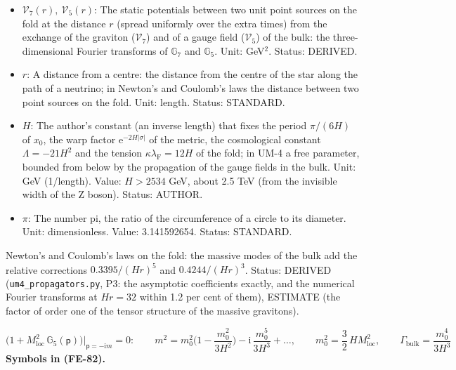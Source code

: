 \documentclass[
  10pt,
]{article}
\providecommand{\tightlist}{%
  \setlength{\itemsep}{0pt}\setlength{\parskip}{0pt}}
\begin{document}
\begin{itemize}
\tightlist
\item
  \(\mathcal{V}_7(r),\ \mathcal{V}_5(r)\): The static potentials between
  two unit point sources on the fold at the distance \(r\) (spread
  uniformly over the extra times) from the exchange of the graviton
  (\(\mathcal{V}_7\)) and of a gauge field (\(\mathcal{V}_5\)) of the
  bulk: the three-dimensional Fourier transforms of \(\mathbb{G}_7\) and
  \(\mathbb{G}_5\). Unit: GeV\(^2\). Status: DERIVED.
\item
  \(r\): A distance from a centre: the distance from the centre of the
  star along the path of a neutrino; in Newton's and Coulomb's laws the
  distance between two point sources on the fold. Unit: length. Status:
  STANDARD.
\item
  \(H\): The author's constant (an inverse length) that fixes the period
  \(\pi/(6H)\) of \(x_0\), the warp factor
  \(\mathrm{e}^{-2H\lvert\sigma\rvert}\) of the metric, the cosmological
  constant \(\Lambda = -21H^2\) and the tension
  \(\kappa\lambda_{\mathrm{F}} = 12H\) of the fold; in UM-4 a free
  parameter, bounded from below by the propagation of the gauge fields
  in the bulk. Unit: GeV (1/length). Value: \(H > 2534\) GeV, about 2.5
  TeV (from the invisible width of the Z boson). Status: AUTHOR.
\item
  \(\pi\): The number pi, the ratio of the circumference of a circle to
  its diameter. Unit: dimensionless. Value: 3.141592654. Status:
  STANDARD.
\end{itemize}

Newton's and Coulomb's laws on the fold: the massive modes of the bulk
add the relative corrections \(0.3395/(Hr)^5\) and \(0.4244/(Hr)^3\).
Status: DERIVED (\texttt{um4\_propagators.py}, P3: the asymptotic
coefficients exactly, and the numerical Fourier transforms at
\(Hr = 32\) within 1.2 per cent of them), ESTIMATE (the factor of order
one of the tensor structure of the massive gravitons).

\[
\Big(1 + M_{\mathrm{loc}}^2\,\mathbb{G}_5(\mathsf{p})\Big)\Big\vert_{\mathsf{p} = -\mathrm{i}m} = 0:\qquad
m^2 = m_0^2\Big(1 - \frac{m_0^2}{3H^2}\Big) - \mathrm{i}\,\frac{m_0^5}{3H^3} + \dots,\qquad
m_0^2 = \frac32\,H M_{\mathrm{loc}}^2,\qquad \Gamma_{\mathrm{bulk}} = \frac{m_0^4}{3H^3} \tag{FE-82}
\] \textbf{Symbols in (FE-82).}
\end{document}

